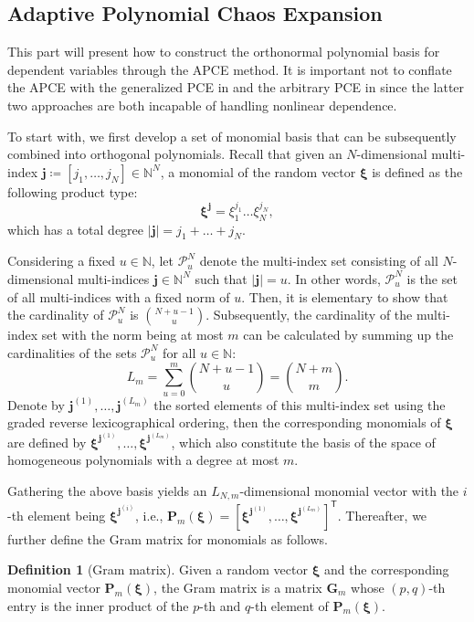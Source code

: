 \documentclass[journal]{IEEEtran}
\theoremstyle{definition}
\newtheorem{definition}{Definition}
\theoremstyle{remark}
\begin{document}
\subsection{Adaptive Polynomial Chaos Expansion}\label{APCE}
This part will present how to construct the orthonormal polynomial basis for dependent variables through the APCE method.
It is important not to conflate the APCE with the generalized PCE in \cite{xiu2002wiener} and the arbitrary PCE in \cite{oladyshkin2012data} since the latter two approaches are both incapable of handling nonlinear dependence.

To start with, we first develop a set of monomial basis that can be subsequently combined into orthogonal polynomials.
Recall that given an $N$-dimensional multi-index $\boldsymbol{j}\coloneqq[j_1,\dots,j_N]\in\mathbb{N}^N$, a monomial of the random vector $\boldsymbol{\xi}$ is defined as the following product type:
\begin{equation}
    \boldsymbol{\xi}^{\boldsymbol{j}}=\xi_1^{j_1}\dots\xi_N^{j_N},
\end{equation}
which has a total degree $\vert\boldsymbol{j}\vert=j_1+\dots+j_N$.

Considering a fixed $u\in\mathbb{N}$, let $\mathcal{P}_u^N$ denote the multi-index set consisting of all $N$-dimensional multi-indices $\boldsymbol{j}\in\mathbb{N}^N$ such that $\vert\boldsymbol{j}\vert=u$. In other words, $\mathcal{P}_u^N$ is the set of all multi-indices with a fixed norm of $u$.
Then, it is elementary to show that the cardinality of $\mathcal{P}_u^N$ is $\binom{N+u-1}{u}$.
Subsequently, the cardinality of the multi-index set with the norm being at most $m$ can be calculated by summing up the cardinalities of the sets $\mathcal{P}_u^N$ for all $u\in\mathbb{N}$: 
\begin{equation}\label{eq:10}
    L_{m}=\sum\limits_{u=0}^m\binom{N+u-1}{u}=\binom{N+m}{m}.
\end{equation}
Denote by $\boldsymbol{j}^{(1)},\dots,\boldsymbol{j}^{(L_{m})}$ the sorted elements of this multi-index set using the graded reverse lexicographical ordering, then the corresponding monomials of $\boldsymbol{\xi}$ are defined by $\boldsymbol{\xi}^{\boldsymbol{j}^{(1)}},\dots,\boldsymbol{\xi}^{\boldsymbol{j}^{(L_{m})}}$, which also constitute the basis of the space of homogeneous polynomials with a degree at most $m$.

Gathering the above basis yields an $L_{N,m}$-dimensional monomial vector with the $i$-th element being $\boldsymbol{\xi}^{\boldsymbol{j}^{(i)}}$, i.e., $\boldsymbol{P}_m(\boldsymbol{\xi})=[\boldsymbol{\xi}^{\boldsymbol{j}^{(1)}},\dots,\boldsymbol{\xi}^{\boldsymbol{j}^{(L_{m})}}]^{\mathsf{T}}$. Thereafter, we further define the Gram matrix for monomials as follows.
\begin{definition}[Gram matrix]\label{def:1}
Given a random vector $\boldsymbol{\xi}$ and the corresponding monomial vector $\boldsymbol{P}_m(\boldsymbol{\xi})$, the Gram matrix is a matrix $\boldsymbol{G}_{m}$ whose $(p,q)$-th entry is the inner product of the $p$-th and $q$-th element of $\boldsymbol{P}_m(\boldsymbol{\xi})$.
\end{definition}
\end{document}
